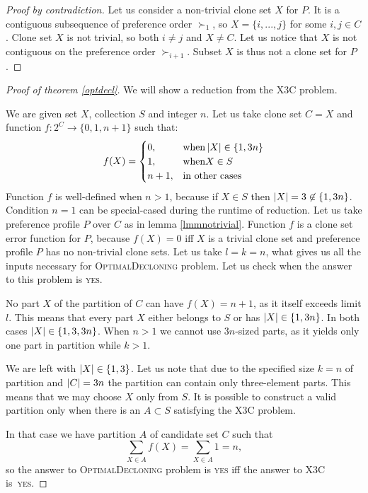 \begin{proof}[Proof by contradiction]
Let us consider a non-trivial clone set $X$ for $P$.
It is a contiguous subsequence of preference order $\succ_1$, so $X = \{i,...,j\}$ for some $i,j \in C$.
Clone set $X$ is not trivial, so both $i\neq{j}$ and $X\neq{C}$.
Let us notice that $X$ is not contiguous on the preference order $\succ_{i+1}$.
Subset $X$ is thus not a clone set for $P$.
\end{proof}

\begin{proof}[Proof of theorem \ref{optdecl}]
We will show a reduction from the \textsc{X3C} problem.

We are given set $X$, collection $S$ and integer $n$.
Let us take clone set $C = X$ and function $f:2^C\rightarrow \{0,1,n+1\}$ such that:
$$ f(X) =
\begin{cases}
0, &\text{when} \left\vert X \right\vert \in \{1,3n\} \\
1, &\text{when} X \in S \\
n+1, &\text{in other cases}
\end{cases}
$$
Function $f$ is well-defined when $n>1$, because if $X \in S$ then $\left\vert X \right\vert = 3 \not\in \{1,3n\}$.
Condition $n=1$ can be special-cased during the runtime of reduction.
Let us take preference profile $P$ over $C$ as in lemma \ref{lmmnotrivial}.
Function $f$ is a clone set error function for $P$, because $f(X) = 0$ iff $X$ is a trivial clone set
and preference profile $P$ has no non-trivial clone sets.
Let us take $l=k=n$, what gives us all the inputs necessary for \textsc{OptimalDecloning} problem.
Let us check when the answer to this problem is \textsc{yes}.

No part $X$ of the partition of $C$ can have $f(X)=n+1$, as it itself exceeds limit $l$.
This means that every part $X$ either belongs to $S$ or has $\left\vert X \right\vert \in \{1,3n\}$.
In both cases $\left\vert X \right\vert \in \{1,3,3n\}$.
When $n>1$ we cannot use $3n$-sized parts,
as it yields only one part in partition while $k>1$.

We are left with $\left\vert X \right\vert \in \{1,3\}$.
Let us note that due to the specified size $k=n$ of partition and $\left\vert C \right\vert = 3n$
the partition can contain only three-element parts.
This means that we may choose $X$ only from $S$.
It is possible to construct a valid partition only when there is an $A \subset S$ satisfying the \textsc{X3C} problem.

In that case we have partition $A$ of candidate set $C$ such that
$$ \sum_{X \in A} f(X) = \sum_{X \in A} 1 = n,$$
so the answer to \textsc{OptimalDecloning} problem is \textsc{yes}
iff the answer to \textsc{X3C} is~\textsc{yes}.
\end{proof}



